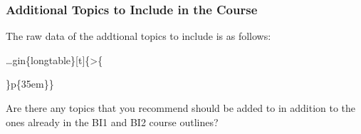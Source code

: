 \documentclass[
]{article}
\begin{document}
\newpage

\subsubsection{Additional Topics to Include in the
Course}\label{additional-topics-to-include-in-the-course}

The raw data of the addtional topics to include is as follows:

\ldots gin\{longtable\}{[}t{]}\{\textgreater\{

\raggedright

\arraybackslash\}p\{35em\}\}

\caption{\label{tab:AdditionalTopics}Are there any topics that you recommend should be added to in addition to the ones already in the BI1 and BI2 course outlines?}
\end{document}
